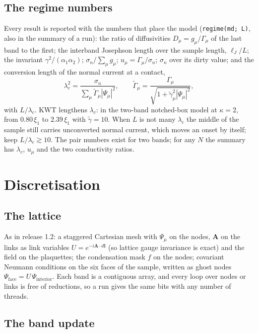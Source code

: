 \documentclass[11pt,a4paper]{article}
\newcommand{\code}[1]{\texttt{#1}}
\newcommand{\gt}{\tilde\gamma}
\begin{document}
\subsection{The regime numbers}
\label{sec:regime}

Every result is reported with the numbers that place the model (\code{regime(md; L)}, also in the summary of a run):
the ratio of diffusivities $D_\mu = g_\mu/\Gamma_\mu$ of the last band to the first; the interband Josephson length over
the sample length, $\ell_J/L$; the invariant $\gamma^2/(\alpha_1\alpha_2)$; $\sigma_n/\sum_\mu g_\mu$; $u_\mu =
\Gamma_\mu/\sigma_n$; $\sigma_n$ over its dirty value; and the conversion length of the normal current at a contact,
\begin{equation}
  \lambda_c^2 = \frac{\sigma_n}{\sum_\mu \tilde\Gamma_\mu |\Psi_\mu|^2}, \qquad
  \tilde\Gamma_\mu = \frac{\Gamma_\mu}{\sqrt{1+\gt_\mu^2|\Psi_\mu|^2}} ,
\end{equation}
with $L/\lambda_c$. KWT lengthens $\lambda_c$: in the two-band notched-box model at $\kappa = 2$, from $0.80\,\xi_1$ to
$2.39\,\xi_1$ with $\gt = 10$. When $L$ is not many $\lambda_c$ the middle of the sample still carries unconverted normal
current, which moves an onset by itself; keep $L/\lambda_c \gtrsim 10$. The pair numbers exist for two bands; for any
$N$ the summary has $\lambda_c$, $u_\mu$ and the two conductivity ratios.

\section{Discretisation}

\subsection{The lattice}

As in release 1.2: a staggered Cartesian mesh with $\Psi_\mu$ on the nodes, $\mathbf A$ on the links as link variables
$U = e^{-i\mathbf A\cdot d\mathbf l}$ (so lattice gauge invariance is exact) and the field on the plaquettes; the
condensation mask $f$ on the nodes; covariant Neumann conditions on the six faces of the sample, written as ghost nodes
$\Psi_{\mathrm{face}} = U\,\Psi_{\mathrm{interior}}$. Each band is a contiguous array, and every loop over nodes or links
is free of reductions, so a run gives the same bits with any number of threads.

\subsection{The band update}
\end{document}
